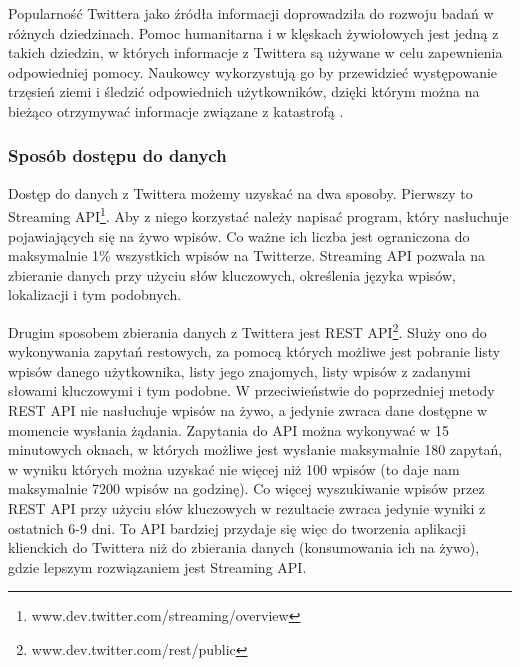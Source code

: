 Popularność Twittera jako źródła informacji doprowadziła do rozwoju badań
w różnych dziedzinach. Pomoc humanitarna i w klęskach żywiołowych jest jedną z
takich dziedzin, w których informacje z Twittera są używane w celu
zapewnienia odpowiedniej pomocy. Naukowcy wykorzystują go by przewidzieć występowanie trzęsień
ziemi i śledzić odpowiednich użytkowników, dzięki którym można na
bieżąco otrzymywać informacje związane z katastrofą
\cite{TwitterDataAnalytics2013}.

\subsubsection{Sposób dostępu do danych}
Dostęp do danych z Twittera możemy uzyskać na dwa sposoby.
Pierwszy to Streaming API\footnote{www.dev.twitter.com/streaming/overview}.
Aby z niego korzystać należy napisać program, który nasłuchuje pojawiających się
na żywo wpisów. Co ważne ich liczba jest ograniczona do maksymalnie 1\% wszystkich
wpisów na Twitterze. Streaming API pozwala na zbieranie danych przy użyciu słów
kluczowych, określenia języka wpisów, lokalizacji i tym podobnych.

Drugim sposobem zbierania danych z Twittera jest REST 
API\footnote{www.dev.twitter.com/rest/public}. Służy ono do wykonywania
zapytań restowych, za pomocą których możliwe jest pobranie listy wpisów
danego użytkownika, listy jego znajomych, listy wpisów z zadanymi słowami
kluczowymi i tym podobne. W przeciwieństwie do poprzedniej metody REST API nie nasłuchuje
wpisów na żywo, a jedynie zwraca dane dostępne w momencie wysłania żądania.
Zapytania do API można wykonywać w 15 minutowych oknach, w których możliwe
jest wysłanie maksymalnie 180 zapytań, w wyniku których można uzyskać
nie więcej niż 100 wpisów (to daje nam maksymalnie 7200 wpisów na godzinę).
Co więcej wyszukiwanie wpisów przez REST API przy użyciu 
słów kluczowych w rezultacie zwraca jedynie wyniki z ostatnich
6-9 dni. 
To API bardziej przydaje się więc do tworzenia aplikacji
klienckich do Twittera niż do zbierania danych (konsumowania ich na żywo),
gdzie lepszym rozwiązaniem jest Streaming API.



